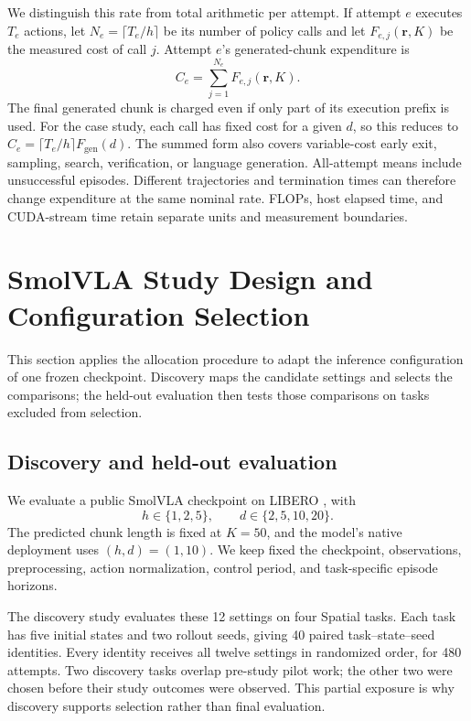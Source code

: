 \documentclass{article}
\begin{document}
We distinguish this rate from total arithmetic per attempt. If attempt $e$
executes $T_e$ actions, let $N_e=\lceil T_e/h\rceil$ be its number of policy
calls and let $F_{e,j}(\mathbf r,K)$ be the measured cost of call $j$. Attempt
$e$'s generated-chunk expenditure is
\begin{equation}
 C_e=\sum_{j=1}^{N_e}F_{e,j}(\mathbf r,K).
 \label{eq:episode-cost}
\end{equation}
The final generated chunk is charged even if only part of its execution prefix
is used. For the case study, each call has fixed cost for a given $d$, so this
reduces to $C_e=\lceil T_e/h\rceil F_{\mathrm{gen}}(d)$. The summed form also
covers variable-cost early exit, sampling, search, verification, or language
generation. All-attempt means include unsuccessful
episodes. Different trajectories and termination times can therefore change
expenditure at the same nominal rate. FLOPs, host elapsed time, and CUDA-stream
time retain separate units and measurement boundaries.

\section{SmolVLA Study Design and Configuration Selection}
\label{sec:method}

This section applies the allocation procedure to adapt the inference
configuration of one frozen checkpoint. Discovery maps the candidate settings
and selects the comparisons; the held-out evaluation then tests those
comparisons on tasks excluded from selection.

\subsection{Discovery and held-out evaluation}

We evaluate a public SmolVLA checkpoint on LIBERO \cite{libero}, with
\[
 h\in\{1,2,5\}, \qquad d\in\{2,5,10,20\}.
\]
The predicted chunk length is fixed at $K=50$, and the model's native deployment
uses $(h,d)=(1,10)$. We keep fixed the checkpoint, observations, preprocessing,
action normalization, control period, and task-specific episode horizons.

The discovery study evaluates these 12 settings on four Spatial tasks. Each
task has five initial states and
two rollout seeds, giving 40 paired task--state--seed identities. Every identity
receives all twelve settings in randomized order, for 480 attempts. Two discovery
tasks overlap pre-study pilot work; the other two were chosen before their study
outcomes were observed. This partial exposure is why discovery supports
selection rather than final evaluation.
\end{document}
